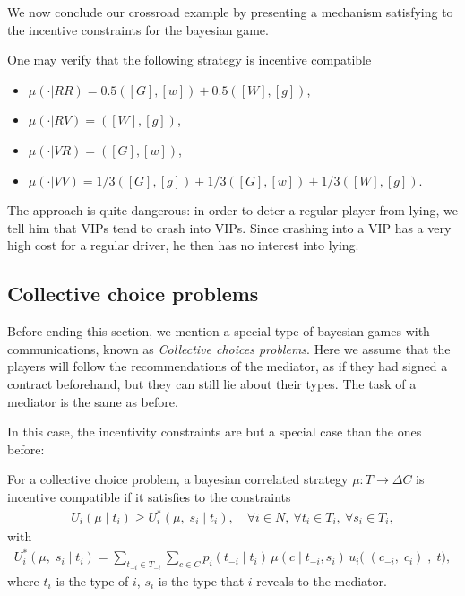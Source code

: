 \begin{example}


We now conclude our crossroad example by presenting a mechanism satisfying to the incentive constraints for the bayesian game.

One may verify that the following strategy is incentive compatible
\begin{itemize}
\item $\mu(\cdot | RR) = 0.5([G], [w]) + 0.5([W], [g])$,
\item $\mu(\cdot | RV) = ([W], [g])$,
\item $\mu(\cdot | VR) = ([G], [w])$,
\item $\mu(\cdot | VV) = 1/3([G],[g]) + 1/3([G], [w]) + 1/3([W], [g])$.
\end{itemize}


The approach is quite dangerous: in order to deter a regular player from lying, we tell him that VIPs tend to crash into VIPs. Since crashing into a VIP has a very high cost for a regular driver, he then has no interest into lying.

\end{example}



\subsection{Collective choice problems}
\label{ch5:subs:coll}
Before ending this section, we mention a special type of bayesian games with communications, known as \emph{Collective choices problems}.  Here we assume that the players will follow the recommendations of the mediator, as if they had signed a contract beforehand, but they can still lie about their types. The task of a mediator is the same as before.

In this case, the incentivity constraints are but a special case than the ones before:
\begin{definition}
For a collective choice problem, a bayesian correlated strategy $\mu : T \rightarrow \Delta C$ is incentive compatible if it satisfies to the constraints
\begin{align*}
	U_i(\mu \; | \; t_i) \geq U_i^*(\mu,  \; s_i \; | \; t_i), \quad \forall i \in N, \ \forall t_i \in T_i, \ \forall s_i \in T_i, 
\end{align*}
with 
\begin{align*}
	U_i^*(\mu, \;  s_i \; | \; t_i) = \sum_{t_{-i} \in T_{-i}} \sum_{c \in C} p_i(t_{-i} \; | \; t_i) \, \mu(c \; | \; t_{-i}, s_i) \, u_i\big( \; (c_{-i}, \; c_i )\;, \; t \big),
\end{align*}
where $t_i$ is the type of $i$, $s_i$ is the type that $i$ reveals to the mediator.
\end{definition}



